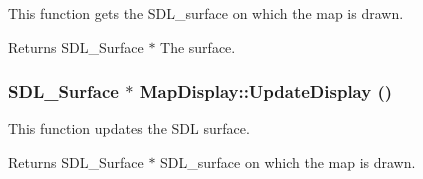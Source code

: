 This function gets the SDL\_\-surface on which the map is drawn. 

\begin{DoxyReturn}{Returns}
SDL\_\-Surface $\ast$ The surface. 
\end{DoxyReturn}
\hypertarget{classMapDisplay_a1f8666a47c77fe1294af449e746430dc}{
\subsubsection[{UpdateDisplay}]{\setlength{\rightskip}{0pt plus 5cm}SDL\_\-Surface $\ast$ MapDisplay::UpdateDisplay ()}}
\label{classMapDisplay_a1f8666a47c77fe1294af449e746430dc}


This function updates the SDL surface. 

\begin{DoxyReturn}{Returns}
SDL\_\-Surface $\ast$ SDL\_\-surface on which the map is drawn. 
\end{DoxyReturn}


